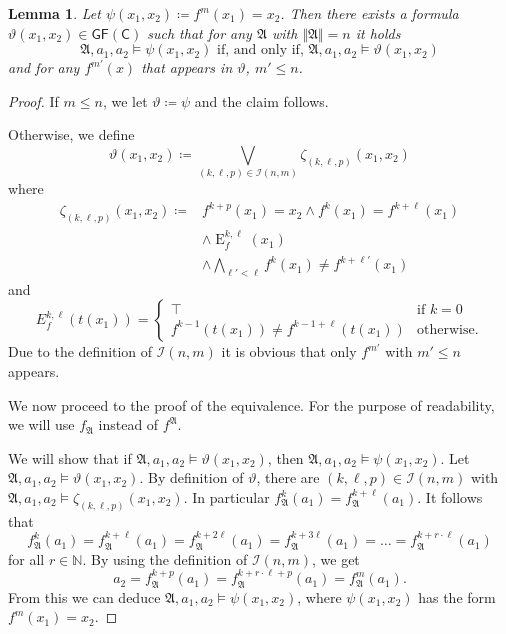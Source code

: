 \documentclass[a4paper,11pt,DIV=15]{scrartcl} %
\theoremstyle{plain}
\newtheorem{lemma}[theorem]{Lemma}
\theoremstyle{definition}
\newcommand{\GFC}{\mathsf{GF}(\mathsf{C})}
\renewcommand{\theta}{\vartheta}
\begin{document}
\begin{lemma}
	Let $\psi(x_1,x_2)\coloneqq f^m(x_1)=x_2$. 
	Then there exists a formula $\theta(x_1,x_2)\in \GFC$ such that for any $\mathfrak A$ with $\Vert \mathfrak A\Vert=n$ it holds
	$$\mathfrak A,a_1,a_2 \models \psi(x_1,x_2) \text{ if, and only if, } \mathfrak A,a_1,a_2 \models \theta(x_1,x_2)$$ 
	and for any $f^{m'}(x)$ that appears in $\theta$, $m'\leq n$.
	\label{Simple_fm_to_fk}
\end{lemma}
\begin{proof}
	If $m \leq n$, we let $\theta\coloneqq\psi$ and the claim follows.
	
	Otherwise, we define
	$$\theta(x_1,x_2)\coloneqq \bigvee_{(k,\ell,p)\in \mathcal I(n,m)} \zeta_{(k,\ell,p)}(x_1,x_2)$$
	where
	\begin{align*}
		\zeta_{(k,\ell,p)}(x_1,x_2)\coloneqq & f^{k+p}(x_1)=x_2 \land f^{k}(x_1)=f^{k+\ell}(x_1) \\
		& \land \operatorname{E}^{k,\ell}_{f}(x_1)  \\
		& \land \bigwedge_{\ell'<\ell}f^{k}(x_1)\neq f^{k+\ell'}(x_1)
	\end{align*}
	and
	$$E^{k,\ell}_{f}(t(x_1))=\begin{cases}
		\top & \text{if } k=0 \\
		f^{k-1}(t(x_1))\neq f^{k-1+\ell}(t(x_1)) & \text{otherwise}.
	\end{cases}$$
	Due to the definition of $\mathcal I(n,m)$ it is obvious that only $f^{m'}$ with $m'\leq n$ appears.
	
	We now proceed to the proof of the equivalence.
	For the purpose of readability, we will use $f_{\mathfrak A}$ instead of $f^{\mathfrak A}$.
	
	We will show that if $\mathfrak A,a_1,a_2 \models \theta(x_1,x_2)$, then $\mathfrak A,a_1,a_2 \models \psi(x_1,x_2)$.
	Let $\mathfrak A,a_1,a_2 \models \theta(x_1,x_2)$. 
	By definition of $\theta$, there are $(k,\ell,p)\in \mathcal I(n,m)$ with $\mathfrak A,a_1,a_2 \models \zeta_{(k,\ell,p)}(x_1,x_2)$.
	In particular $f_{\mathfrak A}^{k}(a_1)=f_{\mathfrak A}^{k+\ell}(a_1)$. It follows that
	$$f_{\mathfrak A}^{k}(a_1)=f_{\mathfrak A}^{k+\ell}(a_1)=f_{\mathfrak A}^{k+2\ell}(a_1)=f_{\mathfrak A}^{k+3\ell}(a_1) = \dots = f_{\mathfrak A}^{k+r\cdot \ell}(a_1)$$
	for all $r\in \mathbb N$. By using the definition of $\mathcal{I}(n,m)$, we get
	$$a_2 =f_{\mathfrak A}^{k+p}(a_1) = f_{\mathfrak A}^{k+r\cdot \ell + p}(a_1)=f_{\mathfrak A}^{m}(a_1).$$
	From this we can deduce $\mathfrak A,a_1,a_2\models \psi(x_1,x_2)$, where $\psi(x_1,x_2)$ has the form $f^{m}(x_1)=x_2$.
	

\end{proof}
\end{document}
